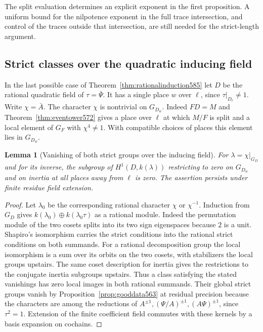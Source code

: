 \documentclass[a4paper,11pt]{article}
\newtheorem{lemma}[proposition]{Lemma}
\theoremstyle{definition}
\theoremstyle{remark}
\numberwithin{equation}{section}
\begin{document}
The split evaluation determines an explicit exponent in the
first proposition. A uniform bound for the nilpotence exponent
in the full trace intersection, and control of the traces outside
that intersection, are still needed for the strict-length argument.


\subsection{Strict classes over the quadratic inducing field}
\label{sec:inducingstrict586}

In the last possible case of Theorem~\ref{thm:rationalinduction585}
let \(D\) be the rational quadratic field of \(\tau=\bar\Psi\).
It has a single place \(w\) over \(\ell\), since
\(\tau|_{D_\ell}\ne1\). Write \(\chi=\bar A\).
The character \(\chi\) is nontrivial on \(G_{D_w}\).
Indeed \(FD=M\) and Theorem~\ref{thm:eventower572} gives a
place over \(\ell\) at which \(M/F\) is split and a local
element of \(G_F\) with \(\chi^4\ne1\). With compatible
choices of places this element lies in \(G_{D_w}\).

\begin{lemma}[Vanishing of both strict groups over the inducing field]
\leavevmode\label{lem:inducingstrict586}
For \(\lambda=\chi|_{G_D}\) and for its inverse, the subgroup
of \(H^1(D,k(\lambda))\) restricting to zero on \(G_{D_w}\)
and on inertia at all places away from \(\ell\) is zero.
The assertion persists under finite residue field extension.
\end{lemma}
\begin{proof}
Let \(\lambda_0\) be the corresponding rational character
\(\chi\) or \(\chi^{-1}\). Induction from \(G_D\) gives
\(k(\lambda_0)\oplus k(\lambda_0\tau)\) as a rational
module. Indeed the permutation module of the two cosets
splits into its two sign eigenspaces because \(2\) is a unit.
Shapiro's isomorphism carries the strict conditions into the
rational strict conditions on both summands. For a rational
decomposition group the local isomorphism is a sum over its
orbits on the two cosets, with stabilizers the local groups
upstairs. The same coset description for inertia gives the
restrictions to the conjugate inertia subgroups upstairs.
Thus a class satisfying the stated vanishings has zero local
images in both rational summands. Their global strict groups
vanish by Proposition~\ref{prop:gooddata563} at residual
precision because the characters are among the reductions of
\(A^{\pm1},(\Psi/A)^{\pm1},(A\Psi)^{\pm1}\), since
\(\tau^2=1\). Extension of the finite coefficient field
commutes with these kernels by a basis expansion on cochains.
\end{proof}
\end{document}
